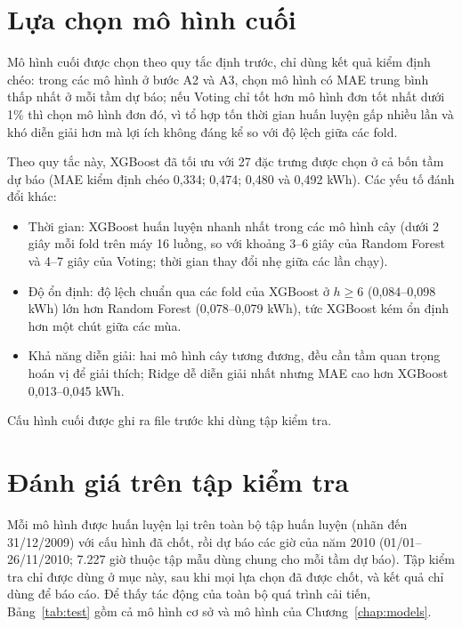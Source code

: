 \section{Lựa chọn mô hình cuối}
\label{sec:final_model}

Mô hình cuối được chọn theo quy tắc định trước, chỉ dùng kết quả kiểm định chéo: trong các mô hình ở bước A2 và A3, chọn mô hình có MAE trung bình thấp nhất ở mỗi tầm dự báo; nếu Voting chỉ tốt hơn mô hình đơn tốt nhất dưới 1\% thì chọn mô hình đơn đó, vì tổ hợp tốn thời gian huấn luyện gấp nhiều lần và khó diễn giải hơn mà lợi ích không đáng kể so với độ lệch giữa các fold.

Theo quy tắc này, XGBoost đã tối ưu với 27 đặc trưng được chọn ở cả bốn tầm dự báo (MAE kiểm định chéo 0,334; 0,474; 0,480 và 0,492 kWh). Các yếu tố đánh đổi khác:
\begin{itemize}
    \item Thời gian: XGBoost huấn luyện nhanh nhất trong các mô hình cây (dưới 2 giây mỗi fold trên máy 16 luồng, so với khoảng 3--6 giây của Random Forest và 4--7 giây của Voting; thời gian thay đổi nhẹ giữa các lần chạy).
    \item Độ ổn định: độ lệch chuẩn qua các fold của XGBoost ở $h \ge 6$ (0,084--0,098 kWh) lớn hơn Random Forest (0,078--0,079 kWh), tức XGBoost kém ổn định hơn một chút giữa các mùa.
    \item Khả năng diễn giải: hai mô hình cây tương đương, đều cần tầm quan trọng hoán vị để giải thích; Ridge dễ diễn giải nhất nhưng MAE cao hơn XGBoost 0,013--0,045 kWh.
\end{itemize}
Cấu hình cuối được ghi ra file trước khi dùng tập kiểm tra.

\section{Đánh giá trên tập kiểm tra}
\label{sec:test}

Mỗi mô hình được huấn luyện lại trên toàn bộ tập huấn luyện (nhãn đến 31/12/2009) với cấu hình đã chốt, rồi dự báo các giờ của năm 2010 (01/01--26/11/2010; 7.227 giờ thuộc tập mẫu dùng chung cho mỗi tầm dự báo). Tập kiểm tra chỉ được dùng ở mục này, sau khi mọi lựa chọn đã được chốt, và kết quả chỉ dùng để báo cáo. Để thấy tác động của toàn bộ quá trình cải tiến, Bảng~\ref{tab:test} gồm cả mô hình cơ sở và mô hình của Chương~\ref{chap:models}.






